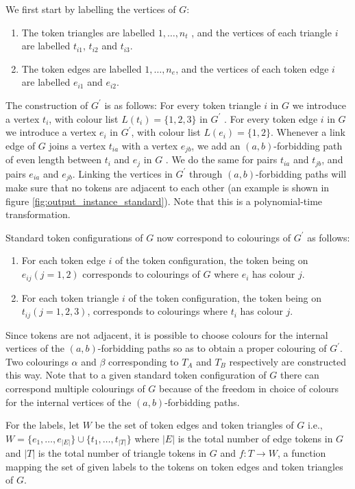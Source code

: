 We first start by labelling the vertices of $G$: 
\begin{enumerate}
  \item The token triangles are labelled $1, \dots , n_{t}$ , and the vertices of each triangle $i$ are labelled
        $t_{i1}$, $t_{i2}$ and $t_{i3}$.
  \item The token edges are labelled $1, \dots , n_{e}$, and the vertices of each token edge $i$ are labelled
        $e_{i1}$ and $e_{i2}$.
\end{enumerate}

The construction of $G^{'}$ is as follows: For every token triangle $i$ in $G$ we introduce a vertex $t_{i}$, with colour list
$L(t_{i}) = \{1, 2, 3\}$ in $G^{'}$ . For every token edge $i$ in $G$ we introduce a vertex $e_{i}$ in $G^{'}$, with colour
list $L(e_{i}) = \{1, 2\}$. Whenever a link edge of $G$ joins a vertex $t_{ia}$ with a vertex $e_{jb}$, we add an $(a, b)$-forbidding
path of even length between $t_{i}$ and $e_{j}$ in $G$ . We do the same for pairs $t_{ia}$ and $t_{jb}$, and pairs $e_{ia}$ and $e_{jb}$.
Linking the vertices in $G^{'}$ through $(a, b)$-forbidding paths will make sure that no tokens are adjacent to each other (an example is
shown in figure \ref{fig:output_instance_standard}). Note that this is a polynomial-time transformation.

Standard token configurations of $G$ now correspond to colourings of $G^{'}$ as follows:
\begin{enumerate}
  \item For each token edge $i$ of the token configuration, the token being on $e_{ij} (j = 1, 2 )$
  corresponds to colourings of $G$ where $e_{i}$ has colour $j$.
  \item For each token triangle $i$ of the token configuration, the token being on $t_{ij} (j = 1, 2, 3)$,
  corresponds to colourings where $t_{i}$ has colour $j$.
\end{enumerate}

Since tokens are not adjacent, it is possible to choose colours for the internal vertices of the $(a, b)$-forbidding paths so as to
obtain a proper colouring of $G^{'}$. Two colourings $\alpha$ and $\beta$ corresponding to $T_{A}$ and $T_{B}$ respectively are constructed
this way. Note that to a given standard token configuration of $G$ there can correspond multiple colourings of $G$ because of the freedom
in choice of colours for the internal vertices of the $(a, b)$-forbidding paths.

For the labels, let $W$ be the set of token edges and token triangles of $G$ i.e., $W = \{e_1,\dots, e_{|E|} \} \cup \{t_1,\dots, t_{|T|} \}$
where $|E|$ is the total number of edge tokens in $G$ and $|T|$ is the total number of triangle tokens in $G$
and $f: T \rightarrow W$, a function mapping the set of given labels to the tokens on token edges and token triangles of $G$.

